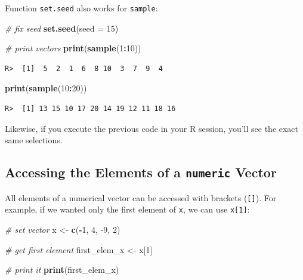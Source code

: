\documentclass[
  12pt,
]{book}
\newenvironment{Shaded}{\begin{snugshade}}{\end{snugshade}}
\newcommand{\CommentTok}[1]{\textcolor[rgb]{0.37,0.37,0.37}{\textit{#1}}}
\newcommand{\DataTypeTok}[1]{\textcolor[rgb]{0.27,0.27,0.27}{#1}}
\newcommand{\DecValTok}[1]{\textcolor[rgb]{0.06,0.06,0.06}{#1}}
\newcommand{\KeywordTok}[1]{\textcolor[rgb]{0.27,0.27,0.27}{\textbf{#1}}}
\newcommand{\NormalTok}[1]{#1}
\newcommand{\OperatorTok}[1]{\textcolor[rgb]{0.43,0.43,0.43}{\textbf{#1}}}
\newcommand{\StringTok}[1]{\textcolor[rgb]{0.5,0.5,0.5}{#1}}
\begin{document}
Function \texttt{set.seed} also works for \texttt{sample}:

\begin{Shaded}
\begin{Highlighting}[]
\CommentTok{# fix seed}
\KeywordTok{set.seed}\NormalTok{(}\DataTypeTok{seed =} \DecValTok{15}\NormalTok{)}

\CommentTok{# print vectors}
\KeywordTok{print}\NormalTok{(}\KeywordTok{sample}\NormalTok{(}\DecValTok{1}\OperatorTok{:}\DecValTok{10}\NormalTok{))}
\end{Highlighting}
\end{Shaded}

\begin{verbatim}
R>  [1]  5  2  1  6  8 10  3  7  9  4
\end{verbatim}

\begin{Shaded}
\begin{Highlighting}[]
\KeywordTok{print}\NormalTok{(}\KeywordTok{sample}\NormalTok{(}\DecValTok{10}\OperatorTok{:}\DecValTok{20}\NormalTok{))}
\end{Highlighting}
\end{Shaded}

\begin{verbatim}
R>  [1] 13 15 10 17 20 14 19 12 11 18 16
\end{verbatim}

Likewise, if you execute the previous code in your R session, you'll see the exact same selections.

\hypertarget{accessing-the-elements-of-a-numeric-vector}{%
\subsection{\texorpdfstring{Accessing the Elements of a \texttt{numeric} Vector}{Accessing the Elements of a numeric Vector}}\label{accessing-the-elements-of-a-numeric-vector}}

All elements of a numerical vector can be accessed with brackets (\texttt{{[}{]}}). For example, if we wanted only the first element of \texttt{x}, we can use \texttt{x{[}1{]}}:

\begin{Shaded}
\begin{Highlighting}[]
\CommentTok{# set vector}
\NormalTok{x <-}\StringTok{ }\KeywordTok{c}\NormalTok{(}\OperatorTok{-}\DecValTok{1}\NormalTok{, }\DecValTok{4}\NormalTok{, }\DecValTok{-9}\NormalTok{, }\DecValTok{2}\NormalTok{)}

\CommentTok{# get first element}
\NormalTok{first_elem_x <-}\StringTok{ }\NormalTok{x[}\DecValTok{1}\NormalTok{]}

\CommentTok{# print it}
\KeywordTok{print}\NormalTok{(first_elem_x)}
\end{Highlighting}
\end{Shaded}
\end{document}
